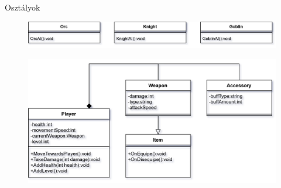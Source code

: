 \documentclass[14pt, aspectratio=169]{beamer}
\begin{document}
\begin{frame}{Osztályok}
{\begin{figure}
			\end{figure}
		}
		{
			\begin{figure}
				\centering
    			\includegraphics[height = 0.18\textheight]{Enemies.png}
			\end{figure}
		}
		{
			\begin{figure}
				\centering
    			\includegraphics[height = 0.6\textheight]{Player.png}
			\end{figure}
		}
	\end{frame}
\end{document}
